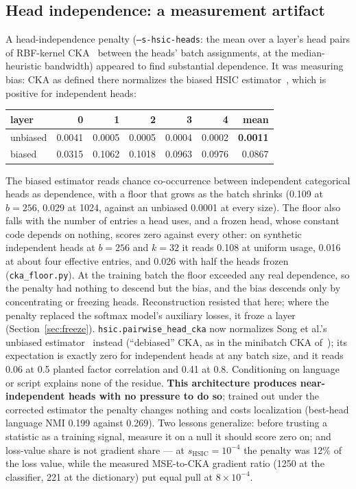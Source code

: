 \subsection{Head independence: a measurement artifact}
\label{sec:hsic}

A head-independence penalty (\texttt{--s-hsic-heads}: the mean over a
layer's head pairs of RBF-kernel CKA~\cite{kornblith2019} between the
heads' batch assignments, at the median-heuristic bandwidth) appeared to
find substantial dependence. It was measuring bias: CKA as defined there
normalizes the biased HSIC estimator~\cite[Eq.~3]{kornblith2019}, which
is positive for independent heads:

\begin{center}\small
\begin{tabular}{@{}lrrrrrr@{}}
\toprule
layer & 0 & 1 & 2 & 3 & 4 & mean \\
\midrule
unbiased & 0.0041 & 0.0005 & 0.0005 & 0.0004 & 0.0002 & \textbf{0.0011} \\
biased   & 0.0315 & 0.1062 & 0.1018 & 0.0963 & 0.0976 & 0.0867 \\
\bottomrule
\end{tabular}
\end{center}

The biased estimator reads chance co-occurrence between independent
categorical heads as dependence, with a floor that grows as the batch
shrinks (0.109 at $b{=}256$, 0.029 at 1024, against an unbiased 0.0001 at
every size). The floor also falls with the number of entries a head
uses, and a frozen head, whose constant code depends on nothing, scores
zero against every other: on synthetic independent heads at $b{=}256$
and $k{=}32$ it reads 0.108 at uniform usage, 0.016 at about four
effective entries, and 0.026 with half the heads frozen
(\texttt{cka\_floor.py}). At the training batch the floor exceeded any
real dependence, so the penalty had nothing to descend but the bias, and
the bias descends only by concentrating or freezing heads.
Reconstruction resisted that here; where the penalty replaced the
softmax model's auxiliary losses, it froze a layer
(Section~\ref{sec:freeze}).
\texttt{hsic.pairwise\_head\_cka} now normalizes Song et al.'s unbiased
estimator~\cite[Eq.~5]{song2012} instead (``debiased'' CKA, as in the
minibatch CKA of~\cite{nguyen2021}); its expectation is exactly zero for
independent heads at any batch size, and it reads 0.06 at 0.5 planted
factor correlation and 0.41 at 0.8. Conditioning on language or script explains
none of the residue. \textbf{This architecture produces near-independent
heads with no pressure to do so}; trained out under the corrected
estimator the penalty changes nothing and costs localization
(best-head language NMI 0.199 against 0.269). Two lessons generalize:
before trusting a statistic as a training signal, measure it on a null
it should score zero on; and loss-value share is not gradient share ---
at $s_{\mathrm{HSIC}}{=}10^{-4}$ the penalty was 12\% of the loss value, while the
measured MSE-to-CKA gradient ratio (1250 at the classifier, 221 at the
dictionary) put equal pull at $8\times10^{-4}$.


